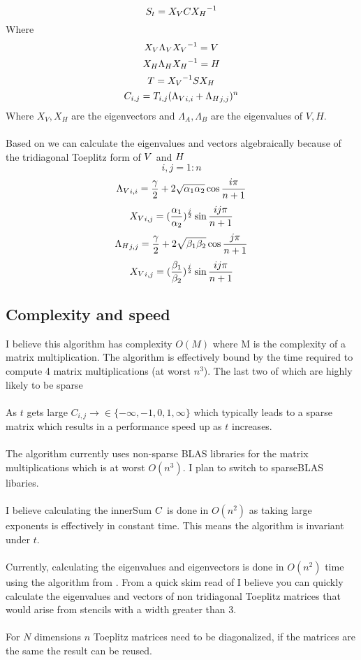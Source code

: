 \documentclass{article}
\begin{document}
\[ S_t = {X_V} C {X_H}^{-1} \] 
Where
\[{X_V} {\Lambda_V} {X_V}^{-1} = V \]
\[{X_H} {\Lambda_H} {X_H}^{-1} = H\]
\[T = {X_V}^{-1} S {X_H}\]
\[C_{i,j} = T_{i,j} ({\Lambda_V}_{i,i} + {\Lambda_H}_{j,j})^n\]
Where $X_V, X_H$ are the eigenvectors and $\Lambda_A,\Lambda_B$ are the eigenvalues of $V,H$. \\ \\
Based on \cite{noschese2013tridiagonal} we can calculate the eigenvalues and vectors 
algebraically because of the tridiagonal Toeplitz form of $V$ and $H$ 
\[ i,j = 1:n\]
\[ {\Lambda_V}_{i,i} = \frac{\gamma}{2} + 2\sqrt{\alpha_{1} \alpha_{2}}\cos{\frac{i\pi}{n+1}}\]
\[ {X_V}_{i,j} = (\frac{\alpha_{1}}{\alpha_{2}})^{\frac{j}{2}}\sin{\frac{ij\pi}{n+1}} \]
\[ {\Lambda_H}_{j,j} = \frac{\gamma}{2} + 2\sqrt{\beta_{1} \beta_{2}}\cos{\frac{j\pi}{n+1}} \]
\[ {X_V}_{i,j} = (\frac{\beta_{1}}{\beta_{2}})^{\frac{j}{2}}\sin{\frac{ij\pi}{n+1}} \]
\subsection*{Complexity and speed}
I believe this algorithm has complexity $O(M)$ where M is the complexity of a matrix multiplication. 
The algorithm is effectively bound by the time required to compute 4 matrix multiplications (at worst $n^3$). The last two of which are highly likely to be sparse \\ \\
As $t$ gets large $C_{i,j} \rightarrow \in \{- \infty, -1, 0, 1, \infty\}$ which typically leads to a sparse matrix 
which results in a performance speed up as $t$ increases.\\ \\
The algorithm currently uses non-sparse BLAS libraries for the matrix multiplications which is at worst $O(n^3)$. 
I plan to switch to sparseBLAS libaries.  \\ \\
I believe calculating the innerSum $C$ is done in $O(n^2)$ as taking large exponents is effectively in constant time. 
This means the algorithm is invariant under $t$. \\ \\ 
Currently, calculating the eigenvalues and eigenvectors is done in $O(n^2)$ time using the algorithm from \cite{noschese2013tridiagonal}.
From a quick skim read of \cite{bogoya2022fast} I believe you can quickly calculate the eigenvalues and vectors of non tridiagonal Toeplitz 
matrices that would arise from stencils with a width greater than 3. \\ \\
For $N$ dimensions $n$ Toeplitz matrices need to be diagonalized, if the matrices are the same the result can be reused. 
\end{document}
